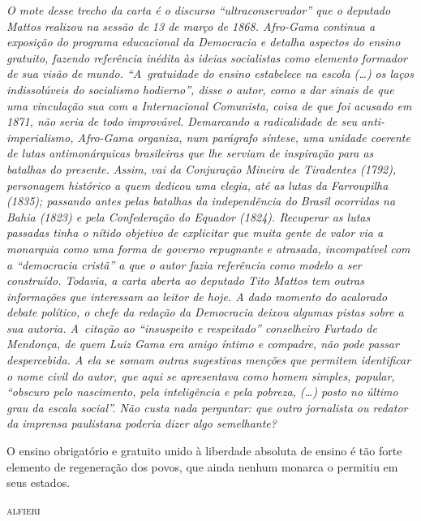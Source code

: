 \begin{didascalia}\itshape
O mote desse trecho da carta é o discurso ``ultraconservador'' que o
deputado Mattos realizou na sessão de 13 de março de 1868. Afro-Gama
continua a exposição do programa educacional da \textnormal{Democracia} e
detalha aspectos do ensino gratuito, fazendo referência inédita às
ideias socialistas como elemento formador de sua visão de mundo. ``A~gratuidade do ensino estabelece na escola (\ldots{}) os laços indissolúveis
do socialismo hodierno'', disse o autor, como a dar sinais de que uma
vinculação sua com a Internacional Comunista, coisa de que foi acusado
em 1871, não seria de todo improvável. Demarcando a radicalidade de seu
anti-imperialismo, Afro-Gama organiza, num parágrafo síntese, uma
unidade coerente de lutas antimonárquicas brasileiras que lhe serviam
de inspiração para as batalhas do presente. Assim, vai da Conjuração
Mineira de Tiradentes (1792), personagem histórico a quem dedicou uma
elegia, até as lutas da Farroupilha (1835); passando antes pelas
batalhas da independência do Brasil ocorridas na Bahia (1823) e pela
Confederação do Equador (1824). Recuperar as lutas
passadas tinha o nítido objetivo de explicitar que muita gente
de valor via a monarquia como uma forma de governo repugnante e
atrasada, incompatível com a ``democracia cristã'' a que o autor fazia
referência como modelo a ser construído. Todavia, a carta aberta ao
deputado Tito Mattos tem outras informações que interessam ao leitor de
hoje. A dado momento do acalorado debate político, o chefe da redação
da \textnormal{Democracia} deixou algumas pistas sobre a sua autoria. A~citação ao ``insuspeito e respeitado'' conselheiro Furtado de Mendonça, de
quem Luiz Gama era amigo íntimo e compadre, não pode passar
despercebida. A ela se somam outras sugestivas menções que permitem
identificar o nome civil do autor, que aqui se apresentava como homem
simples, popular, ``obscuro pelo nascimento, pela inteligência e pela
pobreza, (\ldots{}) posto no último grau da escala social''. Não custa nada
perguntar: que outro jornalista ou redator da imprensa paulistana
poderia dizer algo semelhante?
\end{didascalia}



\epigraph{O ensino obrigatório e gratuito unido à liberdade absoluta de ensino é
tão forte elemento de regeneração dos povos, que ainda nenhum monarca o
permitiu em seus estados.}{\textsc{alfieri}\footnotemark}


